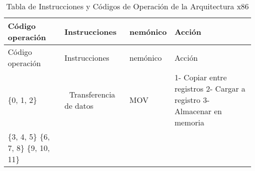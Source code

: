 \documentclass[12pt,twoside]{templates/unerthesis}
\begin{document}
\begin{longtable}[]{@{}llll@{}}
\caption{\label{tab:data}Tabla de Instrucciones y Códigos de Operación de la Arquitectura x86}\tabularnewline
\toprule
\begin{minipage}[b]{0.20\columnwidth}\raggedright
Código operación\strut
\end{minipage} & \begin{minipage}[b]{0.16\columnwidth}\raggedright
Instrucciones\strut
\end{minipage} & \begin{minipage}[b]{0.09\columnwidth}\raggedright
nemónico\strut
\end{minipage} & \begin{minipage}[b]{0.44\columnwidth}\raggedright
Acción\strut
\end{minipage}\tabularnewline
\midrule
\endfirsthead
\toprule
\begin{minipage}[b]{0.20\columnwidth}\raggedright
Código operación\strut
\end{minipage} & \begin{minipage}[b]{0.16\columnwidth}\raggedright
Instrucciones\strut
\end{minipage} & \begin{minipage}[b]{0.09\columnwidth}\raggedright
nemónico\strut
\end{minipage} & \begin{minipage}[b]{0.44\columnwidth}\raggedright
Acción\strut
\end{minipage}\tabularnewline
\midrule
\endhead
\begin{minipage}[t]{0.20\columnwidth}\raggedright
\{0, 1, 2\}\strut
\end{minipage} & \begin{minipage}[t]{0.16\columnwidth}\raggedright
🔄 Transferencia de datos\strut
\end{minipage} & \begin{minipage}[t]{0.09\columnwidth}\raggedright
MOV\strut
\end{minipage} & \begin{minipage}[t]{0.44\columnwidth}\raggedright
1- Copiar entre registros 2- Cargar a registro 3- Almacenar en memoria\strut
\end{minipage}\tabularnewline
\begin{minipage}[t]{0.20\columnwidth}\raggedright
\{3, 4, 5\} \{6, 7, 8\} \{9, 10, 11\}\strut
\end{minipage} & \begin{minipage}[t]{0.16\columnwidth}\raggedright

\end{minipage}
\end{longtable}
\end{document}
